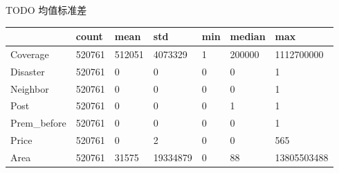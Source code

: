 TODO
均值标准差
\begin{tabular}{lllllll}
\toprule
 & count & mean & std & min & median & max \\
\midrule
Coverage & 520761 & 512051 & 4073329 & 1 & 200000 & 1112700000 \\
Disaster & 520761 & 0 & 0 & 0 & 0 & 1 \\
Neighbor & 520761 & 0 & 0 & 0 & 0 & 1 \\
Post & 520761 & 0 & 0 & 0 & 1 & 1 \\
Prem\_before & 520761 & 0 & 0 & 0 & 0 & 1 \\
Price & 520761 & 0 & 2 & 0 & 0 & 565 \\
Area & 520761 & 31575 & 19334879 & 0 & 88 & 13805503488 \\
\bottomrule
\end{tabular}

